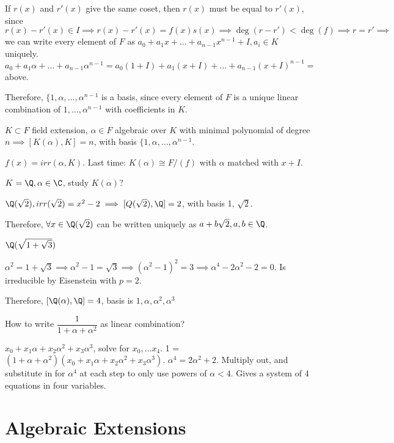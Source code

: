 \documentclass[10pt]{article}
\begin{document}
If $r(x)$ and $r'(x)$ give the same coset, then $r(x)$ must be equal to $r'(x)$, since $r(x) - r'(x) \in I \implies r(x) - r'(x) = f(x)s(x) \implies \deg(r - r') < \deg(f) \implies r = r' \implies$ we can write every element of $F$ as $a_0 + a_1x + \ldots + a_{n-1}x^{n-1} + I, a_i \in K$ uniquely. $a_0 + a_1\alpha + \ldots + a_{n-1}\alpha^{n-1} = a_0(1 + I) + a_1(x + I) + \ldots + a_{n-1}(x + I)^{n-1} =$ above.

Therefore, $\{1, \alpha, \ldots, \alpha^{n-1}$ is a basis, since every element of $F$ is a unique linear combination of $1, \ldots, \alpha^{n-1}$ with coefficients in $K$.

\begin{cor}
    $K \subset F$ field extension, $\alpha \in F$ algebraic over $K$ with minimal polynomial of degree $n \implies[K(\alpha), K] = n$, with basis $\{1, \alpha, \ldots, \alpha^{n-1}$.
\end{cor}

$f(x) = irr(\alpha, K)$. Last time: $K(\alpha) \cong F/(f)$ with $\alpha$ matched with $x + I$.

\begin{exm*}
    $K = \Q, \alpha \in \C$, study $K(\alpha)$?
\end{exm*}
$\Q(\sqrt{2}), irr(\sqrt{2}) = x^2 - 2 \implies [Q(\sqrt{2}), \Q] = 2$, with basis 1, $\sqrt{2}$.

Therefore, $\forall x \in \Q(\sqrt{2})$ can be written uniquely as $a + b\sqrt{2}, a, b\in \Q$.

\begin{exm*}
    $\Q(\sqrt{1 + \sqrt{3}})$
\end{exm*}
$\alpha^2 = 1 + \sqrt{3} \implies \alpha^2 - 1 = \sqrt{3} \implies (\alpha^2 - 1)^2 = 3 \implies \alpha^4 - 2 \alpha^2 - 2 = 0$. Is irreducible by Eisenstein with $p = 2$.

Therefore, $[\Q(\alpha), \Q] = 4$, basis is $1, \alpha, \alpha^2, \alpha^3$

How to write $\dfrac{1}{1 + \alpha + \alpha^2}$ as linear combination?

$x_0 + x_1 \alpha + x_2 \alpha^2 + x_3 \alpha^3$, solve for $x_0,\ldots x_4$. 1 = $(1 + \alpha + \alpha^2)(x_0 + x_1 \alpha + x_2 \alpha^2 + x_3 \alpha^3)$. $\alpha^4 = 2\alpha^2 + 2$. Multiply out, and substitute in for $\alpha^4$ at each step to only use powers of $\alpha < 4$. Gives a system of 4 equations in four variables.

\section{Algebraic Extensions}
\end{document}
